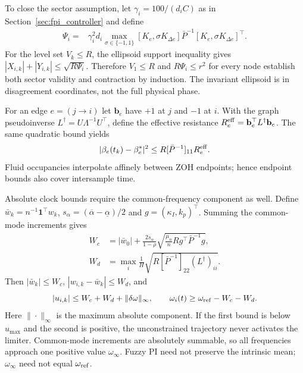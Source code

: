 To close the sector assumption, let $\gamma_i=100/(d_iC)$ as in
Section~\ref{sec:fpi_controller} and define
\begin{align}
 \Psi_i={}&\gamma_i^2d_i\max_{\sigma\in\{-1,1\}}
 [K_e,\sigma K_{\Delta e}]\bar P^{-1}
 [K_e,\sigma K_{\Delta e}]^\top.
 \label{eq:btd_input_factor}
\end{align}
For the level set $V_k\le R$, the ellipsoid support inequality gives
$|X_{i,k}|+|Y_{i,k}|\le\sqrt{R\Psi_i}$.
Therefore $V_1\le R$ and $R\Psi_i\le r^2$ for every node establish
both sector validity and contraction by induction. The invariant
ellipsoid is in disagreement coordinates, not the full physical phase.

For an edge $e=(j\to i)$ let $\mathbf b_e$ have $+1$ at $j$ and $-1$
at $i$. With the graph pseudoinverse
$L^\dagger=U\Lambda^{-1}U^\top$, define the effective resistance
$R_e^{\rm eff}=\mathbf b_e^\top L^\dagger\mathbf b_e$.
The same quadratic bound yields
\begin{equation}
 |\beta_e(t_k)-\beta_e^*|^2
 \le R[\bar P^{-1}]_{11}R_e^{\rm eff}.
 \label{eq:btd_edge_bound}
\end{equation}
Fluid occupancies interpolate affinely between ZOH endpoints; hence
endpoint bounds also cover intersample time.

Absolute clock bounds require the common-frequency component as well.
Define $\bar w_k=n^{-1}\mathbf1^\top w_k$,
$s_\alpha=(\overline\alpha-\underline\alpha)/2$ and
$g=(\kappa_I,k_p)^\top$. Summing the common-mode increments gives
\begin{align}
 W_c&=|\bar w_0|+\frac{2s_\alpha}{1-\rho}
       \sqrt{\frac{\mu_n}{n}R g^\top\bar P^{-1}g},\nonumber\\
 W_d&=\max_i\frac1H\sqrt{R[\bar P^{-1}]_{22}(L^\dagger)_{ii}}.
 \label{eq:btd_clock_bounds}
\end{align}
Then $|\bar w_k|\le W_c$, $|w_{i,k}-\bar w_k|\le W_d$, and
\begin{equation}
 |u_{i,k}|\le W_c+W_d+\|\delta\omega\|_\infty,\qquad
 \omega_i(t)\ge\omega_{\rm ref}-W_c-W_d.
 \label{eq:btd_actuator_bounds}
\end{equation}
Here $\|\cdot\|_\infty$ is the maximum absolute component.
If the first bound is below $u_{\max}$ and the second is positive,
the unconstrained trajectory never activates the limiter. Common-mode
increments are absolutely summable, so all frequencies approach one
positive value $\omega_\infty$. Fuzzy PI need not preserve the intrinsic
mean; $\omega_\infty$ need not equal $\omega_{\rm ref}$.

